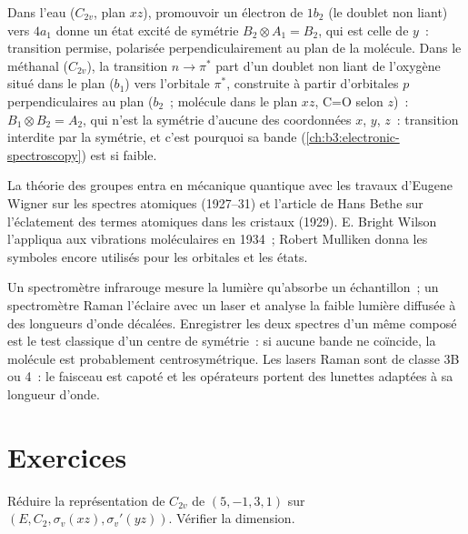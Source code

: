 \begin{example}\label{ex:b3:group-theory-applied:electronic}
Dans l'eau ($C_{2v}$, plan $xz$), promouvoir un électron de $1b_2$ (le
doublet non liant) vers $4a_1$ donne un état excité de symétrie
$B_2\otimes A_1 = B_2$, qui est celle de $y$~:
transition permise, polarisée perpendiculairement au plan de la molécule.
Dans le méthanal
($C_{2v}$), la transition $n\to\pi^*$ part d'un doublet non liant de
l'oxygène situé dans le plan ($b_1$) vers l'orbitale $\pi^*$, construite
à partir d'orbitales $p$ perpendiculaires au plan
($b_2$~; molécule dans le plan $xz$, C=O selon $z$)~: $B_1\otimes B_2 = A_2$,
qui n'est la symétrie d'aucune des coordonnées $x$, $y$, $z$~: transition
interdite par la symétrie, et c'est pourquoi sa bande
(\cref{ch:b3:electronic-spectroscopy}) est si faible.
\end{example}

\begin{history}
La théorie des groupes entra en mécanique quantique avec les travaux
d'Eugene Wigner sur les spectres atomiques (1927--31) et l'article de
Hans Bethe sur l'éclatement des termes atomiques dans les cristaux
(1929). E. Bright Wilson l'appliqua aux vibrations moléculaires en
1934~; Robert Mulliken donna les symboles encore utilisés pour les
orbitales et les états.
\end{history}

\begin{inthelab}
Un spectromètre infrarouge mesure la lumière qu'absorbe un échantillon~;
un spectromètre Raman l'éclaire avec un laser et analyse la faible
lumière diffusée à des longueurs d'onde décalées. Enregistrer les deux
spectres d'un même composé est le test classique d'un centre de
symétrie~: si aucune bande ne coïncide, la molécule est probablement
centrosymétrique. Les lasers Raman sont de classe 3B ou 4~: le faisceau
est capoté et les opérateurs portent des lunettes adaptées à sa longueur
d'onde.
\end{inthelab}

\section{Exercices}

\begin{exercise}[$\star$]\label{exo:b3:group-theory-applied:1}
Réduire la représentation de $C_{2v}$ de  $(5, -1, 3, 1)$ sur $(E, C_2,
\sigma_v(xz), \sigma_v'(yz))$. Vérifier la dimension.
\end{exercise}


